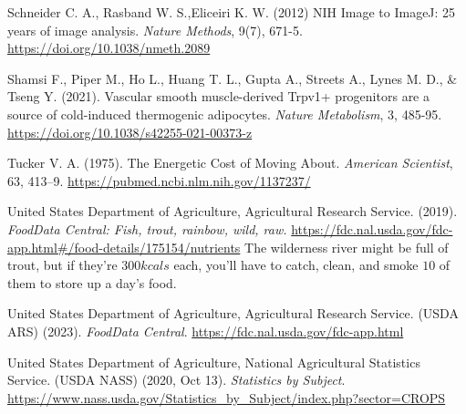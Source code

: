 \documentclass[man]{apa7}
\begin{document}
\begin{thebibliography}{99}
%
Schneider  C. A., Rasband W. S.,Eliceiri K. W.
(2012)
NIH Image to ImageJ: 25 years of image analysis.
\textit{Nature Methods},
9(7), 671-5.
\url{https://doi.org/10.1038/nmeth.2089}

Shamsi F., Piper M., Ho L., Huang T. L., Gupta A., Streets A., Lynes M. D., \& Tseng Y. 
 (2021).
Vascular smooth muscle-derived Trpv1+ progenitors are a source of cold-induced thermogenic adipocytes.
\textit{Nature Metabolism},
3, 485-95.
\url{https://doi.org/10.1038/s42255-021-00373-z}

Tucker V. A. 
(1975).
The Energetic Cost of Moving About.
\textit{American Scientist},
63, 413--9.
\url{https://pubmed.ncbi.nlm.nih.gov/1137237/}

United States Department of Agriculture, Agricultural Research Service.
(2019).
\textit{FoodData Central: Fish, trout, rainbow, wild, raw.}
\url{https://fdc.nal.usda.gov/fdc-app.html#/food-details/175154/nutrients}
The wilderness river might be full of trout, but if they're $300kcals$ each, you'll have to catch, clean, and smoke $10$ of them to store up a day's food.

United States Department of Agriculture, Agricultural Research Service. (USDA ARS)
(2023).
\textit{FoodData Central}. 
\url{https://fdc.nal.usda.gov/fdc-app.html}

United States Department of Agriculture, National Agricultural Statistics Service. (USDA NASS)
(2020, Oct 13).
\textit{Statistics by Subject}.
\url{https://www.nass.usda.gov/Statistics_by_Subject/index.php?sector=CROPS}








\end{thebibliography}
\end{document}
